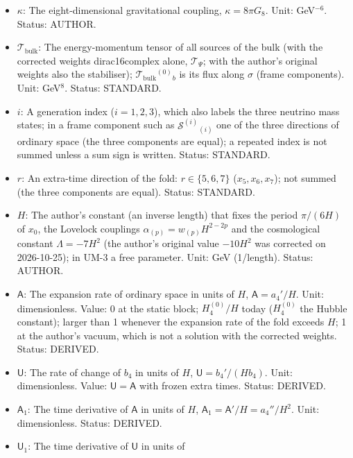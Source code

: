 \documentclass[
  10pt,
]{article}
\providecommand{\tightlist}{%
  \setlength{\itemsep}{0pt}\setlength{\parskip}{0pt}}
\begin{document}
\begin{itemize}
\tightlist
\item
  \(\kappa\): The eight-dimensional gravitational coupling,
  \(\kappa = 8\pi G_8\). Unit: GeV\(^{-6}\). Status: AUTHOR.
\item
  \(\mathcal{T}_{\mathrm{bulk}}\): The energy-momentum tensor of all
  sources of the bulk (with the corrected weights dirac16complex alone,
  \(\mathcal{T}_\Psi\); with the author's original weights also the
  stabiliser); \(\mathcal{T}_{\mathrm{bulk}}{}^{(0)}{}_b\) is its flux
  along \(\sigma\) (frame components). Unit: GeV\(^8\). Status:
  STANDARD.
\item
  \(i\): A generation index (\(i = 1, 2, 3\)), which also labels the
  three neutrino mass states; in a frame component such as
  \(\mathcal{S}^{(i)}{}_{(i)}\) one of the three directions of ordinary
  space (the three components are equal); a repeated index is not summed
  unless a sum sign is written. Status: STANDARD.
\item
  \(r\): An extra-time direction of the fold: \(r \in \{5, 6, 7\}\)
  (\(x_5, x_6, x_7\)); not summed (the three components are equal).
  Status: STANDARD.
\item
  \(H\): The author's constant (an inverse length) that fixes the period
  \(\pi/(6H)\) of \(x_0\), the Lovelock couplings
  \(\alpha_{(p)} = w_{(p)}H^{2-2p}\) and the cosmological constant
  \(\Lambda = -7H^2\) (the author's original value \(-10H^2\) was
  corrected on 2026-10-25); in UM-3 a free parameter. Unit: GeV
  (1/length). Status: AUTHOR.
\item
  \(\mathsf{A}\): The expansion rate of ordinary space in units of
  \(H\), \(\mathsf{A} = a_4'/H\). Unit: dimensionless. Value: 0 at the
  static block; \(H_4^{(0)}/H\) today (\(H_4^{(0)}\) the Hubble
  constant); larger than 1 whenever the expansion rate of the fold
  exceeds \(H\); 1 at the author's vacuum, which is not a solution with
  the corrected weights. Status: DERIVED.
\item
  \(\mathsf{U}\): The rate of change of \(b_4\) in units of \(H\),
  \(\mathsf{U} = b_4'/(Hb_4)\). Unit: dimensionless. Value:
  \(\mathsf{U} = \mathsf{A}\) with frozen extra times. Status: DERIVED.
\item
  \(\mathsf{A}_1\): The time derivative of \(\mathsf{A}\) in units of
  \(H\), \(\mathsf{A}_1 = \mathsf{A}'/H = a_4''/H^2\). Unit:
  dimensionless. Status: DERIVED.
\item
  \(\mathsf{U}_1\): The time derivative of \(\mathsf{U}\) in units of

\end{itemize}
\end{document}
